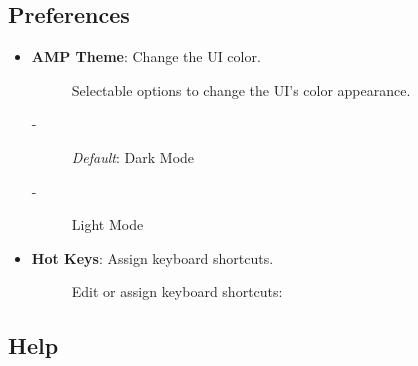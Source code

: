 \documentclass{article}
\begin{document}
\subsection{Preferences}

\begin{itemize}
    \item \textbf{AMP Theme}: Change the UI color.
    \begin{description}
        \item[] Selectable options to change the UI's color appearance.
            \item[-] \textit{Default}: Dark Mode
            \item[-] Light Mode
    \end{description}
    \item \textbf{Hot Keys}: Assign keyboard shortcuts.
    \begin{description}
        \item[] Edit or assign keyboard shortcuts: 
    \end{description}
\end{itemize}

\subsection{Help}
\end{document}

